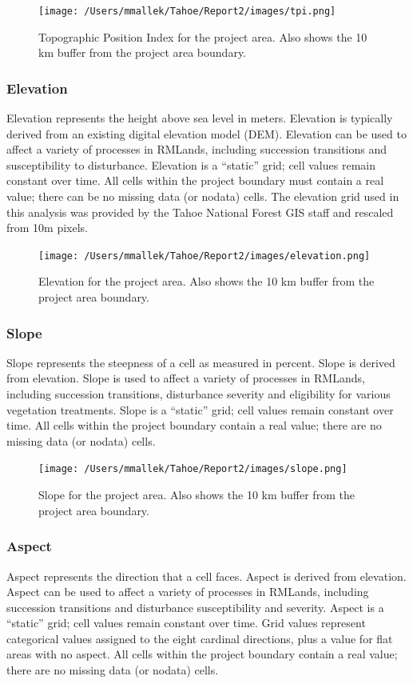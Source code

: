 \begin{figure}[htbp]
\centering
\texttt{[image: /Users/mmallek/Tahoe/Report2/images/tpi.png]}
\caption{Topographic Position Index for the project area. Also shows the 10 km buffer from the project area boundary.} 
\label{tpimap}
\end{figure}

\subsubsection{Elevation} 
Elevation represents the height above sea level in meters. Elevation is typically derived from an existing digital elevation model (DEM). Elevation can be used to affect a variety of processes in RMLands, including succession transitions and susceptibility to disturbance. Elevation is a ``static'' grid; cell values remain constant over time. All cells within the project boundary must contain a real value; there can be no missing data (or nodata) cells. The elevation grid used in this analysis was provided by the Tahoe National Forest GIS staff and rescaled from 10m pixels.

\begin{figure}[htbp]
\centering
\texttt{[image: /Users/mmallek/Tahoe/Report2/images/elevation.png]}
\caption{Elevation for the project area. Also shows the 10 km buffer from the project area boundary.} 
\label{elevationmap}
\end{figure}

\subsubsection{Slope} 
Slope represents the steepness of a cell as measured in percent. Slope is derived from elevation. Slope is used to affect a variety of processes in RMLands, including succession transitions, disturbance severity and eligibility for various vegetation treatments. Slope is a ``static'' grid; cell values remain constant over time. All cells within the project boundary contain a real value; there are no missing data (or nodata) cells. 

\begin{figure}[htbp]
\centering
\texttt{[image: /Users/mmallek/Tahoe/Report2/images/slope.png]}
\caption{Slope for the project area. Also shows the 10 km buffer from the project area boundary.} 
\label{slopemap}
\end{figure}

\subsubsection{Aspect} Aspect represents the direction that a cell faces. Aspect is derived from elevation. Aspect can be used to affect a variety of processes in RMLands, including succession transitions and disturbance susceptibility and severity. Aspect is a ``static'' grid; cell values remain constant over time. Grid values represent categorical values assigned to the eight cardinal directions, plus a value for flat areas with no aspect. All cells within the project boundary  contain a real value; there are no missing data (or nodata) cells. 

